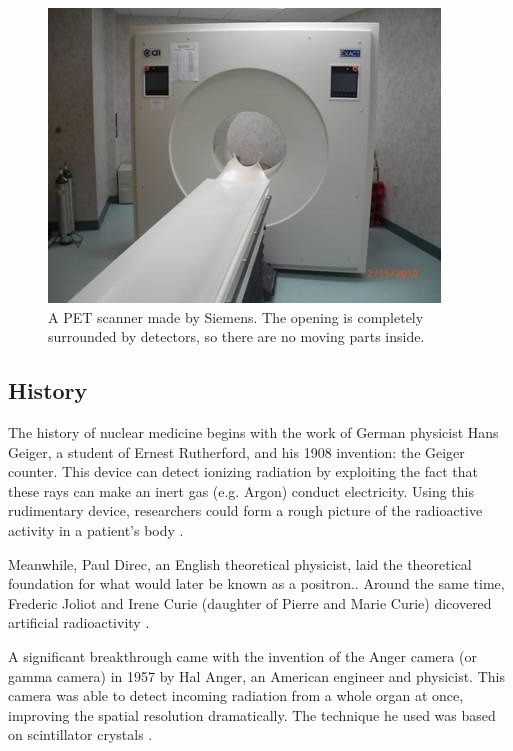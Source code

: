 \begin{figure}[ht]
\begin{center}
  \includegraphics[width=\linewidth]{img/petscanner.jpg}
  \caption{A PET scanner made by Siemens. The opening is completely surrounded
  by detectors, so there are no moving parts inside.}
  \label{fig:petscanner}
\end{center}
\end{figure}

\subsection{History}
The history of nuclear medicine begins with the work of German physicist Hans
Geiger, a student of Ernest Rutherford, and his 1908 invention: the Geiger
counter. This device can detect ionizing radiation by exploiting the fact that
these rays can make an inert gas (e.g. Argon) conduct electricity. Using
this rudimentary device, researchers could form a rough picture of the radioactive
activity in a patient's body \cite{specthistory, geigercountertube}.

Meanwhile, Paul Direc, an English theoretical physicist, laid the theoretical
foundation for what would later be known as a positron.\cite{positrontheory}.
Around the same time, Frederic Joliot and Irene Curie (daughter of Pierre and
Marie Curie) dicovered artificial radioactivity \cite{artificialradio}.

A significant breakthrough came with the invention of the Anger camera (or
gamma camera) in 1957 by Hal Anger, an American engineer and physicist. This
camera was able to detect incoming radiation from a whole organ at once,
improving the spatial resolution dramatically. The technique he used was based
on scintillator crystals \cite{anger}.

